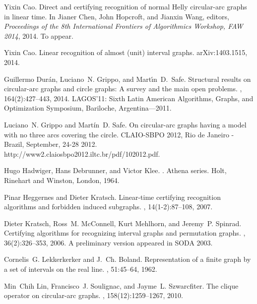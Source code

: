 \documentclass[10pt]{article}
\begin{document}
\begin{thebibliography}{10}
\small
{}
Yixin Cao.
\newblock Direct and certifying recognition of normal {H}elly circular-arc
  graphs in linear time.
\newblock In Jianer Chen, John Hopcroft, and Jianxin Wang, editors, {\em
  Proceedings of the 8th International Frontiers of Algorithmics Workshop, FAW
  2014}, 2014.
\newblock To appear.

Yixin Cao.
\newblock Linear recognition of almost (unit) interval graphs.
\newblock arXiv:1403.1515, 2014.

Guillermo Dur\'an, Luciano~N. Grippo, and Mart\'\i n~D.~Safe.
\newblock Structural results on circular-arc graphs and circle graphs: A survey
  and the main open problems.
, 164(2):427--443, 2014.
\newblock LAGOS'11: Sixth Latin American Algorithms, Graphs, and Optimization
  Symposium, Bariloche, Argentina---2011.

Luciano~N. Grippo and Mart\'in~D. Safe.
\newblock On circular-arc graphs having a model with no three arcs covering the
  circle.
\newblock CLAIO-SBPO 2012, Rio de Janeiro - Brazil, September, 24-28 2012.
  http://www2.claiosbpo2012.iltc.br/pdf/102012.pdf.

Hugo Hadwiger, Hans Debrunner, and Victor Klee.
.
\newblock Athena series. Holt, Rinehart and Winston, London, 1964.

Pinar Heggernes and Dieter Kratsch.
\newblock Linear-time certifying recognition algorithms and forbidden induced
  subgraphs.
, 14(1-2):87--108, 2007.

Dieter Kratsch, Ross~M. McConnell, Kurt Mehlhorn, and Jeremy~P. Spinrad.
\newblock Certifying algorithms for recognizing interval graphs and permutation
  graphs.
, 36(2):326--353, 2006.
\newblock A preliminary version appeared in SODA 2003.

Cornelis~G. Lekkerkerker and J.~Ch. Boland.
\newblock Representation of a finite graph by a set of intervals on the real
  line.
, 51:45--64, 1962.

Min~Chih Lin, Francisco~J. Soulignac, and Jayme~L. Szwarcfiter.
\newblock The clique operator on circular-arc graphs.
, 158(12):1259--1267, 2010.


\end{thebibliography}
\end{document}
